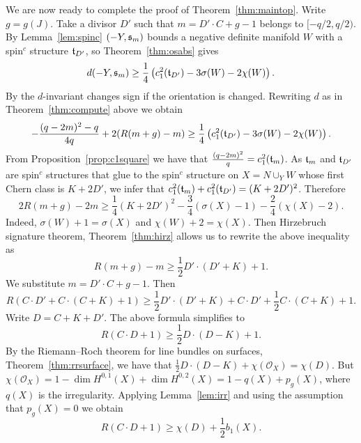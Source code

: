 \documentclass[11pt]{amsart}
\numberwithin{equation}{section}
\theoremstyle{plain}
\theoremstyle{definition}
\begin{document}
We are now ready to complete the proof of Theorem~\ref{thm:maintop}. Write $g=g(J)$. Take a divisor $D'$ 
such that $m=D'\cdot C+g-1$ belongs to $[-q/2,q/2)$.
By Lemma~\ref{lem:spinc} 
$(-Y,{\ifmmode{{\mathfrak s}}\else{${\mathfrak s}$\ }\fi}_m)$ bounds a negative definite manifold $W$ with a {spin$^c$}{} structure ${\ifmmode{{\mathfrak t}}\else{${\mathfrak t}$\ }\fi}_{D'}$, so Theorem~\ref{thm:osabs} gives 
\[d(-Y,{\ifmmode{{\mathfrak s}}\else{${\mathfrak s}$\ }\fi}_m)\ge \frac14\left(c_1^2({\ifmmode{{\mathfrak t}}\else{${\mathfrak t}$\ }\fi}_{D'})-3\sigma(W)-2\chi(W)\right).\]
By \cite[Proposition 4.2]{OS-absolute} the $d$-invariant changes sign if the orientation is changed. 
Rewriting $d$ as in Theorem~\ref{thm:compute} above we obtain
\[-\frac{(q-2m)^2-q}{4q}+2(R(m+g)-m)\ge \frac14\left(c_1^2({\ifmmode{{\mathfrak t}}\else{${\mathfrak t}$\ }\fi}_{D'})-3\sigma(W)-2\chi(W)\right).\]
From Proposition~\ref{prop:c1square} we have that
$\frac{(q-2m)^2}{q}=c_1^2({\ifmmode{{\mathfrak t}}\else{${\mathfrak t}$\ }\fi}_m)$. As ${\ifmmode{{\mathfrak t}}\else{${\mathfrak t}$\ }\fi}_m$ and ${\ifmmode{{\mathfrak t}}\else{${\mathfrak t}$\ }\fi}_{D'}$ are {spin$^c$}{} structures
that glue to the {spin$^c$}{} structure on $X=N\cup_Y W$ 
whose first Chern class is $K+2D'$, we infer that $c_1^2({\ifmmode{{\mathfrak t}}\else{${\mathfrak t}$\ }\fi}_m)+c_1^2({\ifmmode{{\mathfrak t}}\else{${\mathfrak t}$\ }\fi}_{D'})=(K+2D')^2$.
Therefore
\begin{equation}\label{eq:r1}
2R(m+g)-2m\ge \frac14(K+2D')^2-\frac34(\sigma(X)-1)-\frac24(\chi(X)-2).
\end{equation}
Indeed, $\sigma(W)+1=\sigma(X)$ and $\chi(W)+2=\chi(X)$. Then Hirzebruch signature theorem, Theorem~\ref{thm:hirz} allows us to rewrite the above inequality as
\[R(m+g)-m\ge \frac12D'\cdot(D'+K)+1.\]
We substitute $m=D'\cdot C+g-1$. Then
\begin{equation}\label{eq:onR}
R(C\cdot D'+C\cdot(C+K)+1)\ge \frac12 D'\cdot(D'+K)+C\cdot D'+\frac12 C\cdot(C+K)+1.
\end{equation}
Write $D=C+K+D'$. The above formula simplifies to
\[R(C\cdot D+1)\ge \frac12 D\cdot(D-K)+1.\]
By the Riemann--Roch theorem for line bundles on
surfaces, Theorem~\ref{thm:rrsurface}, we have that $\frac12 D\cdot(D-K)+\chi(\mathcal{O}_X)=\chi(D)$. 
But $\chi(\mathcal{O}_X)=1-\dim H^{0,1}(X)+\dim H^{0,2}(X)=1-q(X)+p_g(X)$, where $q(X)$ is the irregularity. Applying Lemma~\ref{lem:irr}
and using the assumption that $p_g(X)=0$ we obtain
\begin{equation}\label{eq:finalonR}
R(C\cdot D+1)\ge \chi(D)+\frac12 b_1(X).
\end{equation}
\end{document}

